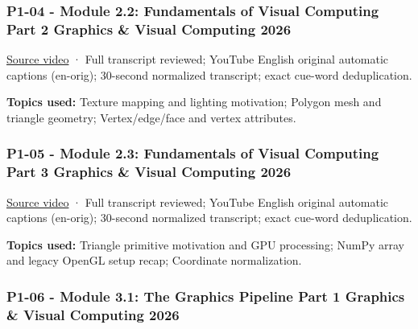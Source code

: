 \subsubsection{P1-04 - Module 2.2: Fundamentals of Visual Computing Part 2 Graphics \& Visual Computing 2026}\label{04-visual-computing-ii-ch036-p1-04---module-2.2-fundamentals-of-visual-computing-part-2-graphics-visual-computing-2026}

\hypertarget{04-visual-computing-ii-ch036-p1-04---module-2.2-fundamentals-of-visual-computing-part-2-graphics-visual-computing-2026}{}

\href{https://www.youtube.com/watch?v=KyFhkeTwnDE}{Source video} · Full transcript reviewed; YouTube English original automatic captions (en-orig); 30-second normalized transcript; exact cue-word deduplication.

\textbf{Topics used:} Texture mapping and lighting motivation; Polygon mesh and triangle geometry; Vertex/edge/face and vertex attributes.

\subsubsection{P1-05 - Module 2.3: Fundamentals of Visual Computing Part 3 Graphics \& Visual Computing 2026}\label{04-visual-computing-ii-ch036-p1-05---module-2.3-fundamentals-of-visual-computing-part-3-graphics-visual-computing-2026}

\hypertarget{04-visual-computing-ii-ch036-p1-05---module-2.3-fundamentals-of-visual-computing-part-3-graphics-visual-computing-2026}{}

\href{https://www.youtube.com/watch?v=VPxqKOYjpG0}{Source video} · Full transcript reviewed; YouTube English original automatic captions (en-orig); 30-second normalized transcript; exact cue-word deduplication.

\textbf{Topics used:} Triangle primitive motivation and GPU processing; NumPy array and legacy OpenGL setup recap; Coordinate normalization.

\subsubsection{P1-06 - Module 3.1: The Graphics Pipeline Part 1 Graphics \& Visual Computing 2026}\label{04-visual-computing-ii-ch036-p1-06---module-3.1-the-graphics-pipeline-part-1-graphics-visual-computing-2026}

\hypertarget{04-visual-computing-ii-ch036-p1-06---module-3.1-the-graphics-pipeline-part-1-graphics-visual-computing-2026}{}

